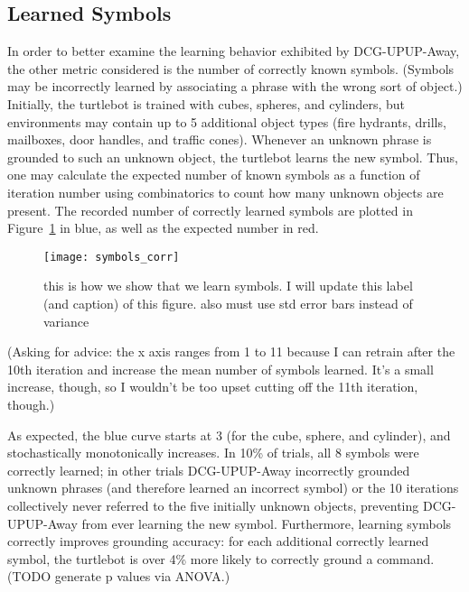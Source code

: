 \subsection{Learned Symbols}
In order to better examine the learning behavior exhibited by DCG-UPUP-Away, the other metric considered is the number of correctly known symbols.
(Symbols may be incorrectly learned by associating a phrase with the wrong sort of object.)
Initially, the turtlebot is trained with cubes, spheres, and cylinders, but environments may contain up to 5 additional object types (fire hydrants, drills, mailboxes, door handles, and traffic cones).
Whenever an unknown phrase is grounded to such an unknown object, the turtlebot learns the new symbol.
Thus, one may calculate the expected number of known symbols as a function of iteration number using combinatorics to count how many unknown objects are present.
The recorded number of correctly learned symbols are plotted in Figure~\ref{fig:symbols} in blue, as well as the expected number in red.\\
\begin{figure}[h]
\centering
\texttt{[image: symbols\_corr]}
\caption{this is how we show that we learn symbols. I will update this label (and caption) of this figure. also must use std error bars instead of variance}
\label{fig:symbols}
\end{figure}
(Asking for advice: the x axis ranges from 1 to 11 because I can retrain after the 10th iteration and increase the mean number of symbols learned. It's a small increase, though, so I wouldn't be too upset cutting off the 11th iteration, though.)

As expected, the blue curve starts at 3 (for the cube, sphere, and cylinder), and stochastically monotonically increases.
In 10\% of trials, all 8 symbols were correctly learned; in other trials DCG-UPUP-Away incorrectly grounded unknown phrases (and therefore learned an incorrect symbol) or the 10 iterations collectively never referred to the five initially unknown objects, preventing DCG-UPUP-Away from ever learning the new symbol.
Furthermore, learning symbols correctly improves grounding accuracy: for each additional correctly learned symbol, the turtlebot is over 4\% more likely to correctly ground a command. (TODO generate p values via ANOVA.)

